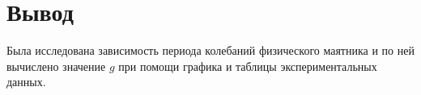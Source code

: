 \section{Вывод}
Была исследована зависимость периода колебаний физического маятника
и по ней вычислено значение $g$ при помощи графика и таблицы экспериментальных данных.
